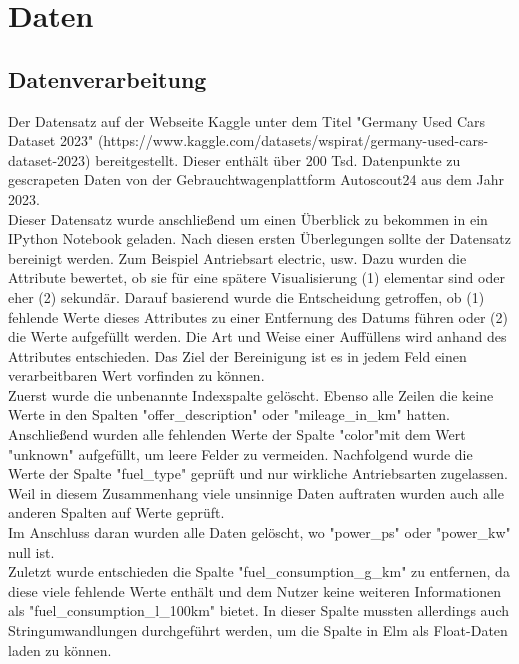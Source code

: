 \documentclass[usegeometry=true]{scrartcl}
\begin{document}




\section{Daten}

\subsection{Datenverarbeitung}

Der Datensatz auf der Webseite Kaggle unter dem Titel "Germany Used Cars Dataset 2023" (https://www.kaggle.com/datasets/wspirat/germany-used-cars-dataset-2023) bereitgestellt. Dieser enthält über 200 Tsd. Datenpunkte zu gescrapeten Daten von der Gebrauchtwagenplattform Autoscout24 aus dem Jahr 2023. \\
Dieser Datensatz wurde anschließend um einen Überblick zu bekommen in ein IPython Notebook geladen. 
Nach diesen ersten Überlegungen sollte der Datensatz bereinigt werden. Zum Beispiel Antriebsart electric, usw.  Dazu wurden die Attribute bewertet, ob sie für eine spätere Visualisierung (1) elementar sind oder eher (2) sekundär. Darauf basierend wurde die Entscheidung getroffen, ob (1) fehlende Werte dieses Attributes zu einer Entfernung des Datums führen oder (2) die Werte aufgefüllt werden. Die Art und Weise einer Auffüllens wird anhand des Attributes entschieden. Das Ziel der Bereinigung ist es in jedem Feld einen verarbeitbaren Wert vorfinden zu können.\\
Zuerst wurde die unbenannte Indexspalte gelöscht.
Ebenso alle Zeilen die keine Werte in den Spalten "offer_description" oder "mileage_in_km" hatten. 
Anschließend wurden alle fehlenden Werte der Spalte "color"mit dem Wert "unknown" aufgefüllt, um leere Felder zu vermeiden. Nachfolgend wurde die Werte  der Spalte "fuel_type" geprüft und nur wirkliche Antriebsarten zugelassen. \\
Weil in diesem Zusammenhang viele unsinnige Daten auftraten wurden auch alle anderen Spalten auf Werte geprüft.\\
Im Anschluss daran wurden alle Daten gelöscht, wo "power_ps" oder "power_kw" null ist.\\
Zuletzt wurde entschieden die Spalte "fuel_consumption_g_km" zu entfernen, da diese viele fehlende Werte enthält und dem Nutzer keine weiteren Informationen als "fuel_consumption_l_100km" bietet. In dieser Spalte mussten allerdings auch Stringumwandlungen durchgeführt werden, um die Spalte in Elm als Float-Daten laden zu können. \\
\end{document}
